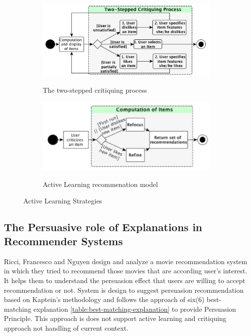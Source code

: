 \begin{figure}[h]
	\begin{subfigure}{.49\textwidth}
	\includegraphics[width=.9\linewidth]{figures/ch2_lamche2014active_1.png}
	\caption{The two-stepped critiquing process}
	\cite{lamche2014active}
	\label{fig:ch2_lamche2014active_1}
	\end{subfigure}
	\begin{subfigure}{.49\textwidth}
	\includegraphics[width=.9\linewidth]{figures/ch2_lamche2014active_2.png}
	\caption{Active Learning recommenation model}
	\cite{lamche2014active}
	\label{fig:ch2_lamche2014active_2}
	\end{subfigure}
	\caption{Active Learning Strategies}
	\label{fig:lamche2014active}
\end{figure}

\subsection{The Persuasive role of Explanations in Recommender Systems}

Ricci, Francesco and Nguyen\cite{gkika2014persuasive} design and analyze a movie recommendation system in which they tried to recommend those movies that are according user’s interest. It helps them to understand the persuasion effect that users are willing to accept recommendation or not. System is design to suggest persuasion recommendation based on Kaptein’s \cite{kaptein2012adaptive} methodology and follows the approach of six(6) best-matching explanation \ref{table:best-matching-explanation} to provide Persuasion Principle. This approach is does not support active learning and critiquing approach not handling of current context.

